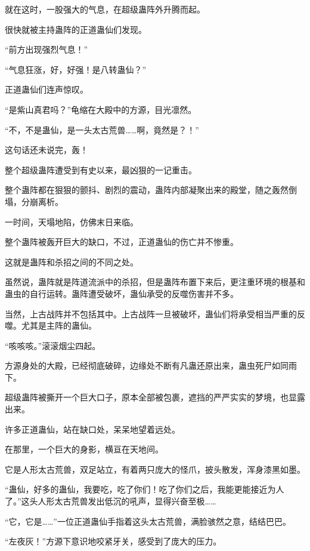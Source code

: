 
\begin{this_body}



就在这时，一股强大的气息，在超级蛊阵外升腾而起。

很快就被主持蛊阵的正道蛊仙们发现。

“前方出现强烈气息！”

“气息狂涨，好，好强！是八转蛊仙？”

正道蛊仙们连声惊叹。

“是紫山真君吗？”龟缩在大殿中的方源，目光凛然。

“不，不是蛊仙，是一头太古荒兽……啊，竟然是？！”

这句话还未说完，轰！

整个超级蛊阵遭受到有史以来，最凶狠的一记重击。

整个蛊阵都在狠狠的颤抖、剧烈的震动，蛊阵内部凝聚出来的殿堂，随之轰然倒塌，分崩离析。

一时间，天塌地陷，仿佛末日来临。

整个蛊阵被轰开巨大的缺口，不过，正道蛊仙的伤亡并不惨重。

这就是蛊阵和杀招之间的不同之处。

虽然说，蛊阵就是阵道流派中的杀招，但是蛊阵布置下来后，更注重环境的根基和蛊虫的自行运转。蛊阵遭受破坏，蛊仙承受的反噬伤害并不多。

当然，上古战阵并不包括其中。上古战阵一旦被破坏，蛊仙们将承受相当严重的反噬。尤其是主阵的蛊仙。

“咳咳咳。”滚滚烟尘四起。

方源身处的大殿，已经彻底破碎，边缘处不断有凡蛊还原出来，蛊虫死尸如同雨下。

超级蛊阵被撕开一个巨大口子，原本全部被包裹，遮挡的严严实实的梦境，也显露出来。

许多正道蛊仙，站在缺口处，呆呆地望着远处。

在那里，一个巨大的身影，横亘在天地间。

它是人形太古荒兽，双足站立，有着两只庞大的怪爪，披头散发，浑身漆黑如墨。

“蛊仙，好多的蛊仙，我要吃，吃了你们！吃了你们之后，我能更能接近为人了。”这头人形太古荒兽发出低沉的吼声，显得兴奋至极……

“它，它是……”一位正道蛊仙手指着这头太古荒兽，满脸骇然之意，结结巴巴。

“左夜灰！”方源下意识地咬紧牙关，感受到了庞大的压力。


\end{this_body}
